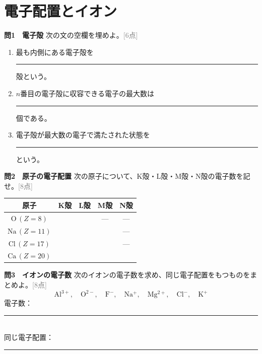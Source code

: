 \documentclass[11pt,a4paper]{ctexart}
\newcommand{\blank}[1]{\rule{#1}{0.4pt}}
\newcommand{\score}[1]{\hfill\textcolor{gray}{[#1点]}}
\newenvironment{qbox}{\begin{list}{}{\setlength{\leftmargin}{0pt}}\item\begin{minipage}{\linewidth}}{\end{minipage}\end{list}\vspace{3mm}}
\begin{document}
\section{電子配置とイオン}

\begin{qbox}
\textbf{問1　電子殻}
\quad 次の文の空欄を埋めよ。\score{6}
\begin{enumerate}[label=(\arabic*),leftmargin=9mm]
\item 最も内側にある電子殻を\blank{18mm}殻という。
\item $n$番目の電子殻に収容できる電子の最大数は\blank{20mm}個である。
\item 電子殻が最大数の電子で満たされた状態を\blank{25mm}という。
\end{enumerate}
\end{qbox}

\begin{qbox}
\textbf{問2　原子の電子配置}
\quad 次の原子について、K殻・L殻・M殻・N殻の電子数を記せ。\score{8}
\begin{center}
\renewcommand{\arraystretch}{1.55}
\begin{tabular}{c|c|c|c|c}
\toprule
原子 & K殻 & L殻 & M殻 & N殻\\ \midrule
$\mathrm{O}\,(Z=8)$  & & & --- & ---\\
$\mathrm{Na}\,(Z=11)$& & & & ---\\
$\mathrm{Cl}\,(Z=17)$& & & & ---\\
$\mathrm{Ca}\,(Z=20)$& & & & \\
\bottomrule
\end{tabular}
\end{center}
\end{qbox}

\begin{qbox}
\textbf{問3　イオンの電子数}
\quad 次のイオンの電子数を求め、同じ電子配置をもつものをまとめよ。\score{8}
\[
\mathrm{Al^{3+}},\quad \mathrm{O^{2-}},\quad \mathrm{F^-},\quad
\mathrm{Na^+},\quad \mathrm{Mg^{2+}},\quad \mathrm{Cl^-},\quad \mathrm{K^+}
\]
電子数：\blank{150mm}\\[3mm]
同じ電子配置：\blank{135mm}
\end{qbox}
\end{document}
